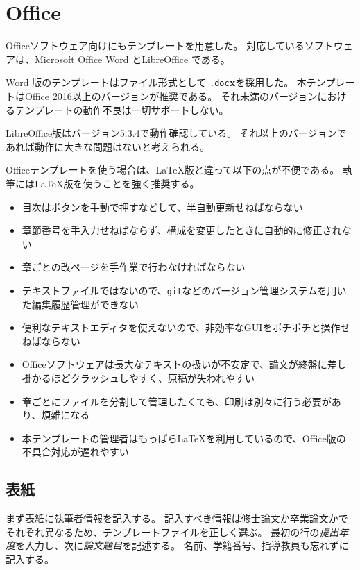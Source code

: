 	\section{Office}
		\label{sec:office}

		Officeソフトウェア向けにもテンプレートを用意した。
		対応しているソフトウェアは、Microsoft Office Word \textsuperscript{\textregistered} とLibreOffice  である。

		Word \textsuperscript{\textregistered} 版のテンプレートはファイル形式として \texttt{.doc}\textbf{x}を採用した。
		本テンプレートはOffice 2016以上のバージョンが推奨である。
		それ未満のバージョンにおけるテンプレートの動作不良は一切サポートしない。

		LibreOffice版はバージョン5.3.4で動作確認している。
		それ以上のバージョンであれば動作に大きな問題はないと考えられる。

		Officeテンプレートを使う場合は、\LaTeX{}版と違って以下の点が不便である。
		執筆には\LaTeX{}版を使うことを強く推奨する。

		\begin{itemize}
			\item 目次はボタンを手動で押すなどして、半自動更新せねばならない
			\item 章節番号を手入力せねばならず、構成を変更したときに自動的に修正されない
			\item 章ごとの改ページを手作業で行わなければならない
			\item テキストファイルではないので、\texttt{git}などのバージョン管理システムを用いた編集履歴管理ができない
			\item 便利なテキストエディタを使えないので、非効率なGUIをポチポチと操作せねばならない
			\item Officeソフトウェアは長大なテキストの扱いが不安定で、論文が終盤に差し掛かるほどクラッシュしやすく、原稿が失われやすい
			\item 章ごとにファイルを分割して管理したくても、印刷は別々に行う必要があり、煩雑になる
			\item 本テンプレートの管理者はもっぱら\LaTeX{}を利用しているので、Office版の不具合対応が遅れやすい
		\end{itemize}

		\subsection{表紙}
			\label{sub:titlepage_w}

			まず表紙に執筆者情報を記入する。
			記入すべき情報は修士論文か卒業論文かでそれぞれ異なるため、テンプレートファイルを正しく選ぶ。
			最初の行の\emph{提出年度}を入力し、次に\emph{論文題目}を記述する。
			名前、学籍番号、指導教員も忘れずに記入する。

